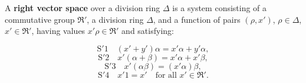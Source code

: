 A \textbf{right vector space} over a division ring $\Delta$ is a system consisting of a commutative group $\mathfrak{R}'$, a division ring $\Delta$, and a function of pairs $(\rho, x')$, $\rho \in \Delta$, $x' \in \mathfrak{R}'$, having values $x'\rho \in \mathfrak{R}'$ and satisfying:

$$
\text{S}'1 \quad (x' + y')\alpha = x'\alpha + y'\alpha,
$$
$$
\text{S}'2 \quad x'(\alpha + \beta) = x'\alpha + x'\beta,
$$
$$
\text{S}'3 \quad x'(\alpha\beta) = (x'\alpha)\beta,
$$
$$
\text{S}'4 \quad x'1 = x' \quad \text{for all } x' \in \mathfrak{R}'.
$$
